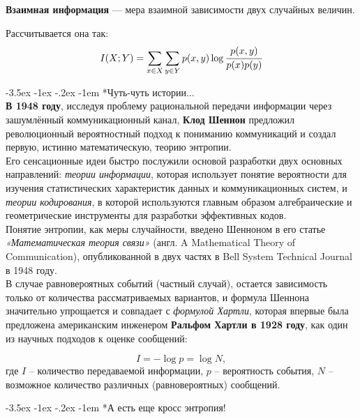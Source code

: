 \documentclass[a4paper, 12pt]{scrreprt}
\makeatletter
\newcommand{\ot}[1]{\textcolor[rgb]{.55,.45,.55}{#1}}
\renewcommand\section{\@startsection{section}{1}{\z@}%
        {-3.5ex \@plus -1ex \@minus -.2ex}%
        {-1em}%
        {\normalfont\large\slshape\bfseries\ot}}
\makeatother
\begin{document}
\begin{siderules}
    \textbf{Взаимная информация} --- мера взаимной зависимости двух случайных величин.
\end{siderules}

Рассчитывается она так:
\[I(X; Y)=\sum\limits_{x\in X}\sum\limits_{y\in Y} p(x, y)\log \cfrac{p(x, y)}{p(x)p(y)} \]

\section*{Чуть-чуть истории... }~\
\\

\textbf{В 1948 году}, исследуя проблему рациональной передачи информации через зашумлённый коммуникационный канал, \textbf{Клод Шеннон} предложил революционный вероятностный подход к пониманию коммуникаций и создал первую, истинно математическую, теорию энтропии. 
\\


Его сенсационные идеи быстро послужили основой разработки двух основных направлений: \textit{теории информации}, которая использует понятие вероятности для изучения статистических характеристик данных и коммуникационных систем, и \textit{теории кодирования}, в которой используются главным образом алгебраические и геометрические инструменты для разработки эффективных кодов.
\\


Понятие энтропии, как меры случайности, введено Шенноном в его статье \textit{«Математическая теория связи»} (англ. A Mathematical Theory of Communication), опубликованной в двух частях в Bell System Technical Journal в 1948 году.
\\


В случае равновероятных событий (частный случай), остается зависимость только от количества рассматриваемых вариантов, и формула Шеннона значительно упрощается и совпадает с \textit{формулой Хартли}, которая впервые была предложена американским инженером \textbf{Ральфом Хартли в 1928 году}, как один из научных подходов к оценке сообщений:

\[I=-\log p = \log N ,\]
где $I$ – количество передаваемой информации, $p$ – вероятность события, $N$ – возможное количество различных (равновероятных) сообщений.


 
\section*{А есть еще кросс энтропия!}~\
\end{document}
